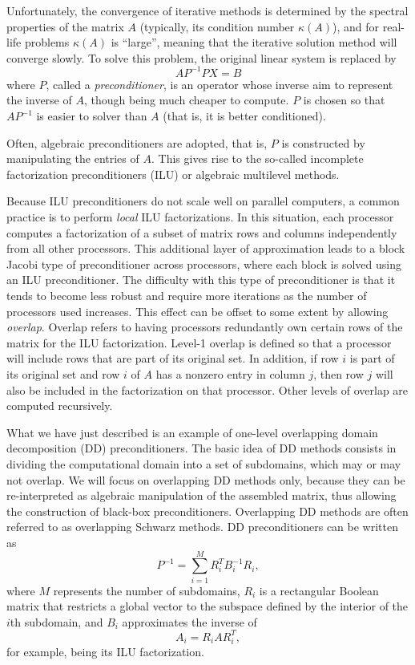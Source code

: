\documentclass[10pt,relax]{SANDreport}
\begin{document}
Unfortunately, the convergence of iterative methods is determined by
the spectral properties of the matrix $A$ (typically, its condition
number $\kappa(A)$), and for real-life problems $\kappa(A)$ is
``large'', meaning that the iterative solution method will converge
slowly. To solve this problem, the original linear system is replaced
by
\[
A P^{-1} P X = B
\]
where $P$, called a {\sl preconditioner}, is an operator whose inverse
aim to represent the inverse of $A$, though being much cheaper to
compute.  $P$ is chosen so that $AP^{-1}$ is easier to solver than $A$
(that is, it is better conditioned).

\smallskip

Often, algebraic preconditioners are adopted, that is, $P$ is
constructed by manipulating the entries of $A$. This gives rise to the
so-called incomplete factorization preconditioners (ILU) or algebraic
multilevel methods.

Because ILU preconditioners do not scale well on parallel computers, a
common practice is to perform {\em local} ILU factorizations.  In this
situation, each processor computes a factorization of a subset of
matrix rows and columns independently from all other processors.  This
additional layer of approximation leads to a block Jacobi type of
preconditioner across processors, where each block is solved using an
ILU preconditioner.  The difficulty with this type of preconditioner
is that it tends to become less robust and require more iterations as
the number of processors used increases.  This effect can be offset to
some extent by allowing {\em overlap}.  Overlap refers to having
processors redundantly own certain rows of the matrix for the ILU
factorization.  Level-1 overlap is defined so that a processor will
include rows that are part of its original set.  In addition, if row
$i$ is part of its original set and row $i$ of $A$ has a nonzero entry
in column $j$, then row $j$ will also be included in the factorization
on that processor.  Other levels of overlap are computed recursively.

What we have just described is an example of one-level overlapping
domain decomposition (DD) preconditioners.  The basic idea of DD
methods consists in dividing the computational domain into a set of
subdomains, which may or may not overlap. We will focus on overlapping
DD methods only, because they can be re-interpreted as algebraic
manipulation of the assembled matrix, thus allowing the construction
of black-box preconditioners. Overlapping DD methods are often
referred to as overlapping Schwarz methods. DD preconditioners can be
written as
\begin{equation}
  \label{eq:prec_dd}
  P^{-1} = \sum_{i=1}^M R_i^T B_i^{-1} R_i,
\end{equation}
where $M$ represents the number of subdomains, $R_i$ is a rectangular
Boolean matrix that restricts a global vector to the subspace defined
by the interior of the $i$th subdomain, and $B_i$ approximates the
inverse of
\begin{equation}
  \label{eq:aztecoo_tilde_a}
  A_i = R_i A R_i^T ,
\end{equation}
for example, being its ILU factorization.
\end{document}
